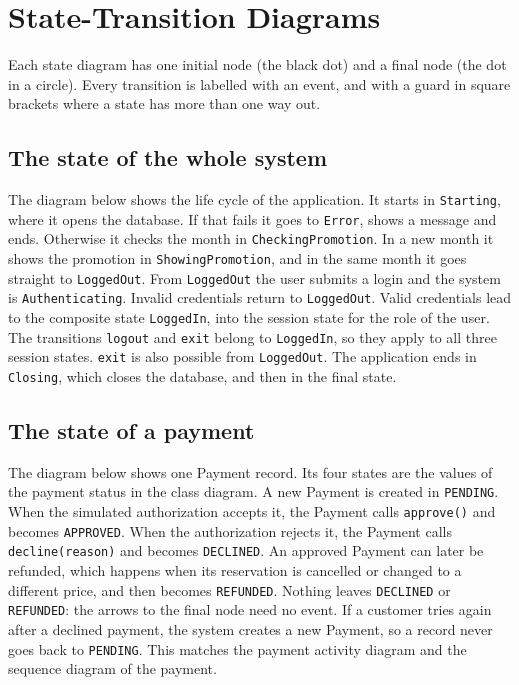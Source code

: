 \section{State-Transition Diagrams}

Each state diagram has one initial node (the black dot) and a final node
(the dot in a circle). Every transition is labelled with an event, and with a
guard in square brackets where a state has more than one way out.

\subsection*{The state of the whole system}

The diagram below shows the life cycle of the application. It starts
in \texttt{Starting}, where it opens the database. If that fails it goes to
\texttt{Error}, shows a message and ends. Otherwise it checks the month in
\texttt{CheckingPromotion}. In a new month it shows the promotion in
\texttt{ShowingPromotion}, and in the same month it goes straight to
\texttt{LoggedOut}. From \texttt{LoggedOut} the user submits a login and the
system is \texttt{Authenticating}. Invalid credentials return to
\texttt{LoggedOut}. Valid credentials lead to the composite state
\texttt{LoggedIn}, into the session state for the role of the user. The
transitions \texttt{logout} and \texttt{exit} belong to \texttt{LoggedIn}, so they
apply to all three session states. \texttt{exit} is also possible from
\texttt{LoggedOut}. The application ends in \texttt{Closing}, which closes the
database, and then in the final state.


\subsection*{The state of a payment}

The diagram below shows one Payment record. Its four states are the values of
the payment status in the class diagram. A new Payment is created in
\texttt{PENDING}. When the simulated authorization accepts it, the Payment calls
\texttt{approve()} and becomes \texttt{APPROVED}. When the authorization rejects
it, the Payment calls \texttt{decline(reason)} and becomes \texttt{DECLINED}. An
approved Payment can later be refunded, which happens when its reservation is
cancelled or changed to a different price, and then becomes \texttt{REFUNDED}.
Nothing leaves \texttt{DECLINED} or \texttt{REFUNDED}: the arrows to the final
node need no event. If a customer tries again after a declined payment, the
system creates a new Payment, so a record never goes back to \texttt{PENDING}.
This matches the payment activity diagram and the sequence diagram of the
payment.

